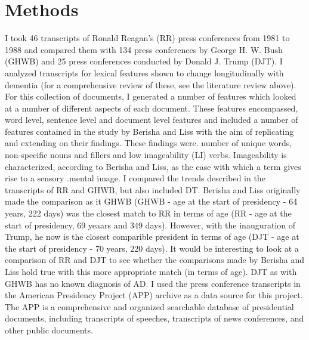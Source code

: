 \documentclass[10pt, letterpaper, twoside, openany]{book}
\begin{document}
\section{Methods}
I took 46 transcripts of Ronald Reagan’s (RR) press conferences from 1981 to 1988 and compared them with 134 press conferences by George H. W. Bush (GHWB) and 25 press conferences conducted by Donald J. Trump (DJT).  I analyzed transcripts for lexical features shown to change longitudinally with dementia  (for a comprehensive review of these, see the literature review above). For this collection of documents, I generated a number of features which looked at a number of different aspects of each document. These features encompassed, word level, sentence level and document level features and included a number of features contained in the study by Berisha and Liss with the aim of replicating and extending on their findings. These findings were. number of unique words, non-specific nouns and fillers and low imageability (LI) verbs. Imageability is characterized, according to Berisha and Liss, as the ease with which a term gives rise to a sensory .mental image. I compared the trends described in the transcripts of RR and GHWB, but also included DT. Berisha and Liss originally made the comparison as it GHWB (GHWB - age at the start of presidency - 64 years, 222 days) was the closest match to RR in terms of age (RR  - age at the start of presidency, 69 yeaars and 349 days). However, with the inauguration of Trump, he now is the closest comparible president in terms of age (DJT - age at the start of presidency - 70 years, 220 days). It would be interesting to look at a comparison of RR and DJT to see whether the comparisons made by Berisha and Liss hold true with this more appropriate match (in terms of age). DJT as with GHWB has no known diagnosis of AD. I used the press conference transcripts in the American Presidency Project (APP) archive as a data source for this project. The APP is a comprehensive and organized searchable database of presidential documents, including transcripts of speeches, transcripts of news conferences, and other public documents.
\end{document}
